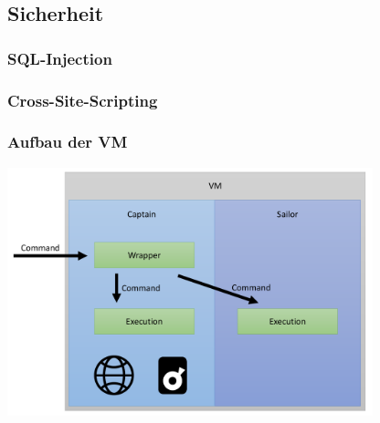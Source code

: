 \subsection{Sicherheit}

\begin{frame}
\frametitle{SQL-Injection}
\end{frame}

\begin{frame}
\frametitle{Cross-Site-Scripting}

\end{frame}

\begin{frame}
\frametitle{Aufbau der VM}
\includegraphics[width=300pt]{security/user.pdf}

\end{frame}